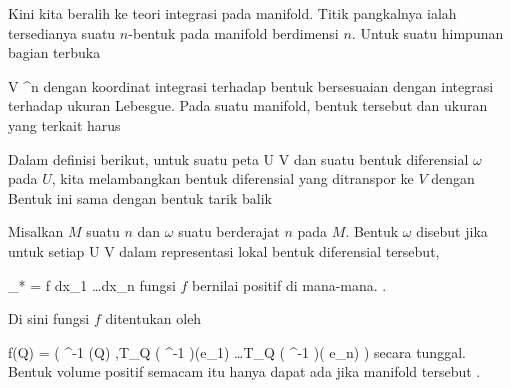 \setcounter{section}{15}

Kini kita beralih ke teori integrasi pada manifold. Titik pangkalnya ialah tersedianya suatu $n$-bentuk pada manifold berdimensi $n$. Untuk suatu himpunan bagian terbuka

\mavergleichskette
{\vergleichskette
{ V
}
{ \subseteq }{ \R^n
}
{  }{
}
{    }{
}
{   }{
}
}
{}{}{}
dengan koordinat
 integrasi terhadap bentuk
 bersesuaian dengan integrasi terhadap ukuran Lebesgue. Pada suatu manifold, bentuk tersebut dan ukuran yang terkait harus 


Dalam definisi berikut, untuk suatu peta
\maabb {\alpha} { U } { V
} {}
dan suatu bentuk diferensial $\omega$ pada $U$, kita melambangkan bentuk diferensial yang ditranspor ke $V$ dengan
 Bentuk ini sama dengan bentuk tarik balik

{}
{

Misalkan $M$ suatu
 $n$
dan $\omega$ suatu
berderajat $n$ pada $M$. Bentuk $\omega$ disebut  jika untuk setiap
 {} {}
\maabbdisp {\alpha} { U } { V
} {}
 {} {}
dalam representasi lokal bentuk diferensial tersebut,

\mavergleichskettedisp
{\vergleichskette
{ \alpha_* \omega
}
{ =} { f dx_1 \wedge \ldots \wedge dx_n
}
{ } {
}
{ } {
}
{ } {
}
}
{}{}{}
fungsi $f$ bernilai positif di mana-mana. {.} {}

}
Di sini fungsi $f$ ditentukan oleh

\mavergleichskettedisphandlinks
{\vergleichskettedisphandlinks
{ f(Q)
}
{ =} { \omega \left(  \alpha^{-1} (Q) ,T_Q \left(  \alpha^{-1}  \right)(e_1) \wedge \ldots \wedge T_Q \left(  \alpha^{-1}  \right)( e_n)  \right)
}
{ } {
}
{ } {
}
{ } {
}
}
{}{}{}
secara tunggal. Bentuk volume positif semacam itu hanya dapat ada jika manifold tersebut
 {} {.}



